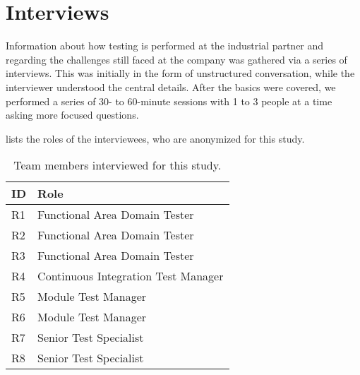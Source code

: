 \section{Interviews}
\label{sec:ind_interviews}


Information about how testing is performed at the industrial partner and regarding the challenges still faced at the company was gathered via a series of interviews.
This was initially in the form of unstructured conversation, while the interviewer understood the central details.
After the basics were covered, we performed a series of 30- to 60-minute sessions with 1 to 3 people at a time asking more focused questions.

 lists the roles of the interviewees, who are anonymized for this study.

\begin{table}[]
\centering
{}
\begin{tabular}{ll}
\toprule
\textbf{ID} & \textbf{Role} \\
\midrule
R1 & Functional Area Domain Tester \\
R2 & Functional Area Domain Tester \\
R3 & Functional Area Domain Tester \\
R4 & Continuous Integration Test Manager \\
R5 & Module Test Manager \\
R6 & Module Test Manager \\
R7 & Senior Test Specialist \\
R8 & Senior Test Specialist \\
\bottomrule
\end{tabular}\\
\caption{Team members interviewed for this study.}
\label{table:interviewees}
\end{table}

%

